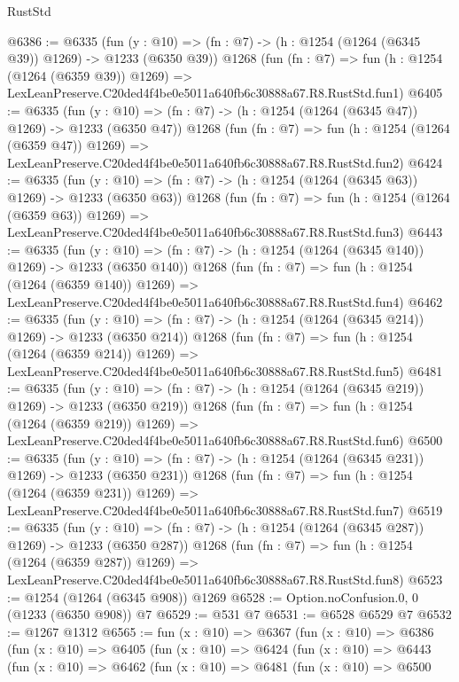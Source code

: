 \begin{lexlean}{RustStd}
\begin{coremodule}
@6386 := @6335
    (fun (y : @10) => (fn : @7) -> (h : @1254 (@1264 (@6345 @39)) @1269) -> @1233 (@6350 @39))
    @1268
    (fun (fn : @7) =>
    fun (h : @1254 (@1264 (@6359 @39)) @1269) =>
    LexLeanPreserve.C20ded4f4be0e5011a640fb6c30888a67.R8.RustStd.fun1)
@6405 := @6335
    (fun (y : @10) => (fn : @7) -> (h : @1254 (@1264 (@6345 @47)) @1269) -> @1233 (@6350 @47))
    @1268
    (fun (fn : @7) =>
    fun (h : @1254 (@1264 (@6359 @47)) @1269) =>
    LexLeanPreserve.C20ded4f4be0e5011a640fb6c30888a67.R8.RustStd.fun2)
@6424 := @6335
    (fun (y : @10) => (fn : @7) -> (h : @1254 (@1264 (@6345 @63)) @1269) -> @1233 (@6350 @63))
    @1268
    (fun (fn : @7) =>
    fun (h : @1254 (@1264 (@6359 @63)) @1269) =>
    LexLeanPreserve.C20ded4f4be0e5011a640fb6c30888a67.R8.RustStd.fun3)
@6443 := @6335
    (fun (y : @10) => (fn : @7) -> (h : @1254 (@1264 (@6345 @140)) @1269) -> @1233 (@6350 @140))
    @1268
    (fun (fn : @7) =>
    fun (h : @1254 (@1264 (@6359 @140)) @1269) =>
    LexLeanPreserve.C20ded4f4be0e5011a640fb6c30888a67.R8.RustStd.fun4)
@6462 := @6335
    (fun (y : @10) => (fn : @7) -> (h : @1254 (@1264 (@6345 @214)) @1269) -> @1233 (@6350 @214))
    @1268
    (fun (fn : @7) =>
    fun (h : @1254 (@1264 (@6359 @214)) @1269) =>
    LexLeanPreserve.C20ded4f4be0e5011a640fb6c30888a67.R8.RustStd.fun5)
@6481 := @6335
    (fun (y : @10) => (fn : @7) -> (h : @1254 (@1264 (@6345 @219)) @1269) -> @1233 (@6350 @219))
    @1268
    (fun (fn : @7) =>
    fun (h : @1254 (@1264 (@6359 @219)) @1269) =>
    LexLeanPreserve.C20ded4f4be0e5011a640fb6c30888a67.R8.RustStd.fun6)
@6500 := @6335
    (fun (y : @10) => (fn : @7) -> (h : @1254 (@1264 (@6345 @231)) @1269) -> @1233 (@6350 @231))
    @1268
    (fun (fn : @7) =>
    fun (h : @1254 (@1264 (@6359 @231)) @1269) =>
    LexLeanPreserve.C20ded4f4be0e5011a640fb6c30888a67.R8.RustStd.fun7)
@6519 := @6335
    (fun (y : @10) => (fn : @7) -> (h : @1254 (@1264 (@6345 @287)) @1269) -> @1233 (@6350 @287))
    @1268
    (fun (fn : @7) =>
    fun (h : @1254 (@1264 (@6359 @287)) @1269) =>
    LexLeanPreserve.C20ded4f4be0e5011a640fb6c30888a67.R8.RustStd.fun8)
@6523 := @1254 (@1264 (@6345 @908)) @1269
@6528 := Option.noConfusion.{0, 0} (@1233 (@6350 @908)) @7
@6529 := @531 @7
@6531 := @6528 @6529 @7
@6532 := @1267 @1312
@6565 := fun (x : @10) =>
  @6367
    (fun (x : @10) =>
    @6386
      (fun (x : @10) =>
      @6405
        (fun (x : @10) =>
        @6424
          (fun (x : @10) =>
          @6443
            (fun (x : @10) =>
            @6462
              (fun (x : @10) =>
              @6481
                (fun (x : @10) =>
                @6500

\end{coremodule}
\end{lexlean}
